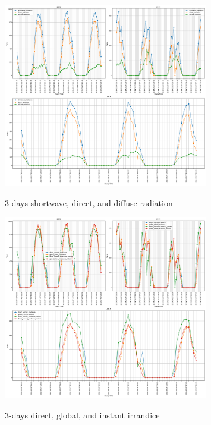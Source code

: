 \begin{figure}[h]
	\centering
	\caption{3-days shortwave, direct, and diffuse radiation }
	\includegraphics[width=0.8\textwidth]{graphs/weather_variables/3_shortwave_radiation_direct_radiation_diffuse_radiation.png}
	\label{fig:direct_diffuse_rad_3days}
\end{figure}

\begin{figure}[h]
	\centering
	\caption{3-days direct, global, and instant irrandice }
	\includegraphics[width=0.8\textwidth]{graphs/weather_variables/3_direct_normal_irradiance_global_tilted_irradiance_direct_normal_irradiance_instant.png}
	\label{fig:irradiance_3days}
\end{figure}

